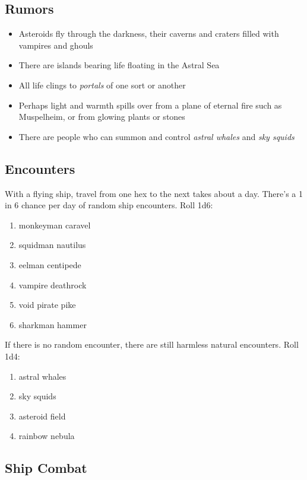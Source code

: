 \documentclass[11pt]{bxart}
\begin{document}
\subsection{Rumors}

\begin{itemize}
\item Asteroids fly through the darkness, their caverns and craters filled with vampires and ghouls
\item There are islands bearing life floating in the Astral Sea
\item All life clings to \textit{portals} of one sort or another
\item Perhaps light and warmth spills over from a plane of eternal fire such as Muspelheim, or from glowing plants or stones
\item There are people who can summon and control \textit{astral whales} and \textit{sky squids}
\end{itemize}

\subsection{Encounters}

With a flying ship, travel from one hex to the next takes about a day. There's a 1 in 6 chance per day of random ship encounters. Roll 1d6:

\begin{enumerate}
\item monkeyman caravel
\item squidman nautilus
\item eelman centipede
\item vampire deathrock 
\item void pirate pike
\item sharkman hammer
\end{enumerate}

If there is no random encounter, there are still harmless natural encounters. Roll 1d4:

\begin{enumerate}
\item astral whales
\item sky squids
\item asteroid field
\item rainbow nebula
\end{enumerate}

\subsection{Ship Combat}
\end{document}
